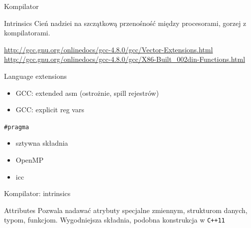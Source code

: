 \begin{frame}{Kompilator}
	\begin{block}{Intrinsics}
		Cień nadziei na szczątkową przenośność między procesorami, gorzej z kompilatorami.
		\begin{itemize}
			\item \verb*%__builtin_expect%
			\item \verb*%__builtin_cpu_supports("sse2")%
		\end{itemize}
		\url{http://gcc.gnu.org/onlinedocs/gcc-4.8.0/gcc/Vector-Extensions.html}
		\url{http://gcc.gnu.org/onlinedocs/gcc-4.8.0/gcc/X86-Built_002din-Functions.html}
	\end{block}
	\begin{block}{Language extensions}
		\begin{itemize}
			\item GCC: extended asm (ostrożnie, spill rejestrów)
			\item GCC: explicit reg vars
		\end{itemize}
	\end{block}
	\begin{block}{\texttt{\#pragma}}
		\begin{itemize}
			\item sztywna składnia
			\item OpenMP
			\item icc
		\end{itemize}
	\end{block}
\end{frame}
\begin{frame}{Kompilator: intrinsics}
	\begin{block}{Attributes}
		Pozwala nadawać atrybuty specjalne zmiennym, strukturom danych, typom, funkcjom. Wygodniejsza składnia, podobna konstrukcja w \texttt{C++11}
	\end{block}
\end{frame}
